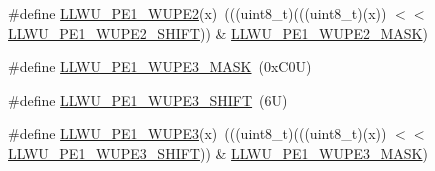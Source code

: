 \begin{DoxyCompactItemize}
\item 
\#define \mbox{\hyperlink{group___l_l_w_u___register___masks_gae6a462624a848afff074ae6e6da83cb0}{L\+L\+W\+U\+\_\+\+P\+E1\+\_\+\+W\+U\+P\+E2}}(x)~(((uint8\+\_\+t)(((uint8\+\_\+t)(x)) $<$$<$ \mbox{\hyperlink{group___l_l_w_u___register___masks_ga0b1bb86eb31a82a18ad1491b0305000b}{L\+L\+W\+U\+\_\+\+P\+E1\+\_\+\+W\+U\+P\+E2\+\_\+\+S\+H\+I\+FT}})) \& \mbox{\hyperlink{group___l_l_w_u___register___masks_ga97e8e2fc8ce673f6b4625d307bc94b4a}{L\+L\+W\+U\+\_\+\+P\+E1\+\_\+\+W\+U\+P\+E2\+\_\+\+M\+A\+SK}})
\item 
\#define \mbox{\hyperlink{group___l_l_w_u___register___masks_ga44cae929b3178e210eb5e1346a4ce997}{L\+L\+W\+U\+\_\+\+P\+E1\+\_\+\+W\+U\+P\+E3\+\_\+\+M\+A\+SK}}~(0x\+C0\+U)
\item 
\#define \mbox{\hyperlink{group___l_l_w_u___register___masks_gaceee1b1b6323ba4d33abf875718e885a}{L\+L\+W\+U\+\_\+\+P\+E1\+\_\+\+W\+U\+P\+E3\+\_\+\+S\+H\+I\+FT}}~(6\+U)
\item 
\#define \mbox{\hyperlink{group___l_l_w_u___register___masks_ga3dfb03917664cd276f352b77e95624b9}{L\+L\+W\+U\+\_\+\+P\+E1\+\_\+\+W\+U\+P\+E3}}(x)~(((uint8\+\_\+t)(((uint8\+\_\+t)(x)) $<$$<$ \mbox{\hyperlink{group___l_l_w_u___register___masks_gaceee1b1b6323ba4d33abf875718e885a}{L\+L\+W\+U\+\_\+\+P\+E1\+\_\+\+W\+U\+P\+E3\+\_\+\+S\+H\+I\+FT}})) \& \mbox{\hyperlink{group___l_l_w_u___register___masks_ga44cae929b3178e210eb5e1346a4ce997}{L\+L\+W\+U\+\_\+\+P\+E1\+\_\+\+W\+U\+P\+E3\+\_\+\+M\+A\+SK}})
\end{DoxyCompactItemize}
